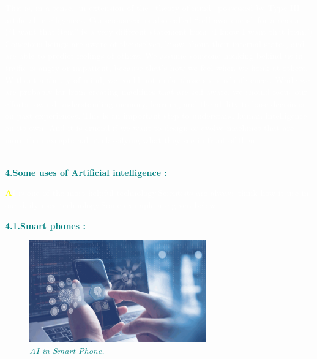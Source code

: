 \documentclass[12pt]{article}
\begin{document}
\textcolor{white}{This is, in a sense, an extension of the “theory of mind” possessed by Type III artificial intelligences. Consciousness is also called “self-awareness” for a reason. (“I want that item” is a very different statement from “I know I want that item.”) Conscious beings are aware of themselves, know about their internal states, and are able to predict feelings of others. We assume someone honking behind us in traffic is angry or impatient, because that’s how we feel when we honk at others. Without a theory of mind, we could not make those sorts of inferences.
While we are probably far from creating machines that are self-aware, we should focus our efforts toward understanding memory, learning and the ability to base decisions on past experiences. This is an important step to understand human intelligence on its own. And it is crucial if we want to design or evolve machines that are more than exceptional at classifying what they see in front of them.}\\\\

\begin{large}
\textbf{\textcolor{teal}{4.Some uses of Artificial intelligence :}}\\
\end{large}
\textcolor{white}{\textbf{\textcolor{yellow}{\huge A}}I is one of the most helpful technology.Scientists are always think how it use in our daily uses technology.Some example are given below:}\\

\begin{large}
\textbf{\textcolor{teal}{4.1.Smart phones :}}\\
\end{large}

\begin{figure}
\centering
\includegraphics[width=3in]{Best-Practices-for-Integrating-AI-in-Mobile-App-Development-1}
\caption{\textit{\textcolor{teal}{AI in Smart Phone.}}}
\end{figure}
\end{document}
